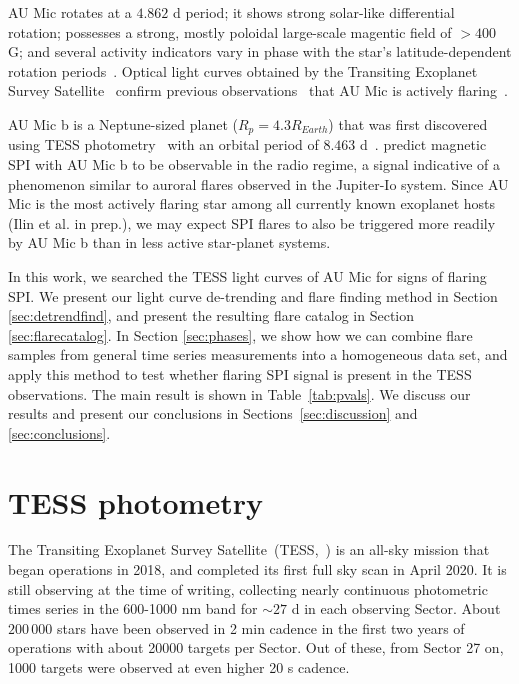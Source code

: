 \documentclass[fleqn,usenatbib,letters]{mnras}%
\begin{document}
AU Mic rotates at a $4.862$ d period; it shows strong solar-like differential rotation; possesses a strong, mostly poloidal large-scale magentic field of $>400$ G; and several activity indicators vary in phase with the star's latitude-dependent rotation periods~\citep{klein2021}. Optical light curves obtained by the Transiting Exoplanet Survey Satellite~\citep[TESS,][]{ricker2014} confirm previous observations~\citep{katsova1999, robinson2001, redfield2002} that AU Mic is actively flaring~\citep{martioli2021new}.

AU Mic b is a Neptune-sized planet ($R_p = 4.3R_{Earth}$) that was first discovered using TESS photometry~\citep{plavchan2020} with an orbital period of $8.463$ d~\citep{plavchan2020,martioli2021new}. %
\citet{kavanagh2021} predict magnetic SPI with AU Mic b to be observable in the radio regime, a signal indicative of a phenomenon similar to auroral flares observed in the Jupiter-Io system. Since AU Mic is the most actively flaring star among all currently known exoplanet hosts (Ilin et al. in prep.), we may expect SPI flares to also be triggered more readily by AU Mic b than in less active star-planet systems. 

In this work, we searched the TESS light curves of AU Mic for signs of flaring SPI. We present our light curve de-trending and flare finding method in Section \ref{sec:detrendfind}, and present the resulting flare catalog in Section \ref{sec:flarecatalog}. In Section \ref{sec:phases}, we show how we can combine flare samples from general time series measurements into a homogeneous data set, and apply this method to test whether flaring SPI signal is present in the TESS observations. The main result is shown in Table~\ref{tab:pvals}. We discuss our results and present our conclusions in Sections~\ref{sec:discussion} and \ref{sec:conclusions}.


\section{TESS photometry}
The Transiting Exoplanet Survey Satellite~(TESS,~\citealt{ricker2014}) is an all-sky mission that began operations in 2018, and completed its first full sky scan in April 2020. It is still observing at the time of writing, collecting nearly continuous photometric times series in the 600-1000 nm band for $\sim 27$ d in each observing Sector. About $200\,000$ stars have been observed in 2 min cadence in the first two years of operations with about 20000 targets per Sector. Out of these, from Sector 27 on, 1000 targets were observed at even higher 20 s cadence.
\end{document}
